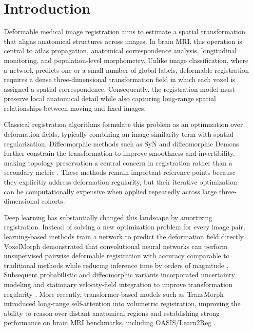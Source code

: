 \section{Introduction}
\label{sec:introduction}


Deformable medical image registration aims to estimate a spatial transformation that aligns anatomical structures across images. In brain MRI, this operation is central to atlas propagation, anatomical correspondence analysis, longitudinal monitoring, and population-level morphometry. Unlike image classification, where a network predicts one or a small number of global labels, deformable registration requires a dense three-dimensional transformation field in which each voxel is assigned a spatial correspondence. Consequently, the registration model must preserve local anatomical detail while also capturing long-range spatial relationships between moving and fixed images.

Classical registration algorithms formulate this problem as an optimization over deformation fields, typically combining an image similarity term with spatial regularization. Diffeomorphic methods such as SyN and diffeomorphic Demons further constrain the transformation to improve smoothness and invertibility, making topology preservation a central concern in registration rather than a secondary metric \citep{avants2008syn,vercauteren2009diffeomorphic}. These methods remain important reference points because they explicitly address deformation regularity, but their iterative optimization can be computationally expensive when applied repeatedly across large three-dimensional cohorts.


Deep learning has substantially changed this landscape by amortizing registration. Instead of solving a new optimization problem for every image pair, learning-based methods train a network to predict the deformation field directly. VoxelMorph demonstrated that convolutional neural networks can perform unsupervised pairwise deformable registration with accuracy comparable to traditional methods while reducing inference time by orders of magnitude \citep{balakrishnan2019voxelmorph}. Subsequent probabilistic and diffeomorphic variants incorporated uncertainty modeling and stationary velocity-field integration to improve transformation regularity \citep{dalca2019probabilistic}. More recently, transformer-based models such as TransMorph introduced long-range self-attention into volumetric registration, improving the ability to reason over distant anatomical regions and establishing strong performance on brain MRI benchmarks, including OASIS/Learn2Reg \citep{chen2022transmorph}.

